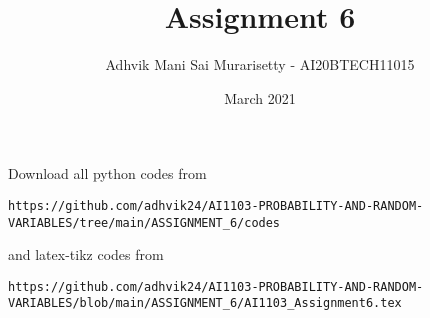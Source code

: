 \documentclass[journal,12pt,twocolumn]{IEEEtran}
\date{March 2021}
\DeclareMathOperator*{\Res}{Res}
\begin{document}
\newcommand{\BEQA}{\begin{eqnarray}}
\newcommand{\EEQA}{\end{eqnarray}}
\newcommand{\define}{\stackrel{\triangle}{=}}

\raggedbottom
\setlength{\parindent}{0pt}
\providecommand{\mbf}{\mathbf}
\providecommand{\pr}[1]{\ensuremath{\Pr\left(#1\right)}}
\providecommand{\qfunc}[1]{\ensuremath{Q\left(#1\right)}}
\providecommand{\fn}[1]{\ensuremath{f\left(#1\right)}}
\providecommand{\e}[1]{\ensuremath{E\left(#1\right)}}
\providecommand{\sbrak}[1]{\ensuremath{{}\left[#1\right]}}
\providecommand{\lsbrak}[1]{\ensuremath{{}\left[#1\right.}}
\providecommand{\rsbrak}[1]{\ensuremath{{}\left.#1\right]}}
\providecommand{\brak}[1]{\ensuremath{\left(#1\right)}}
\providecommand{\lbrak}[1]{\ensuremath{\left(#1\right.}}
\providecommand{\rbrak}[1]{\ensuremath{\left.#1\right)}}
\providecommand{\cbrak}[1]{\ensuremath{\left\{#1\right\}}}
\providecommand{\lcbrak}[1]{\ensuremath{\left\{#1\right.}}
\providecommand{\rcbrak}[1]{\ensuremath{\left.#1\right\}}}
\theoremstyle{remark}
\newtheorem{rem}{Remark}
\newcommand{\sgn}{\mathop{\mathrm{sgn}}}
\providecommand{\abs}[1]{\vert#1\vert}
\providecommand{\res}[1]{\Res\displaylimits_{#1}} 
\providecommand{\norm}[1]{\lVert#1\rVert}
\providecommand{\mtx}[1]{\mathbf{#1}}
\providecommand{\mean}[1]{E[ #1 ]}
\providecommand{\fourier}{\overset{\mathcal{F}}{ \rightleftharpoons}}
\providecommand{\system}{\overset{\mathcal{H}}{ \longleftrightarrow}}
\newcommand{\solution}{\noindent \textbf{Solution: }}
\newcommand{\cosec}{\,\text{cosec}\,}
\providecommand{\dec}[2]{\ensuremath{\overset{#1}{\underset{#2}{\gtrless}}}}
\newcommand{\myvec}[1]{\ensuremath{\begin{pmatrix}#1\end{pmatrix}}}
\newcommand{\mydet}[1]{\ensuremath{\begin{vmatrix}#1\end{vmatrix}}}
\makeatletter
\vspace{3cm}
\title{Assignment 6}
\author{Adhvik Mani Sai Murarisetty - AI20BTECH11015}
\maketitle
\newpage
\bigskip
\renewcommand{\thetable}{\theenumi}
Download all python codes from 
\begin{lstlisting}
https://github.com/adhvik24/AI1103-PROBABILITY-AND-RANDOM-VARIABLES/tree/main/ASSIGNMENT_6/codes
\end{lstlisting}
%
and latex-tikz codes from 
%
\begin{lstlisting}
https://github.com/adhvik24/AI1103-PROBABILITY-AND-RANDOM-VARIABLES/blob/main/ASSIGNMENT_6/AI1103_Assignment6.tex
\end{lstlisting}
\end{document}
